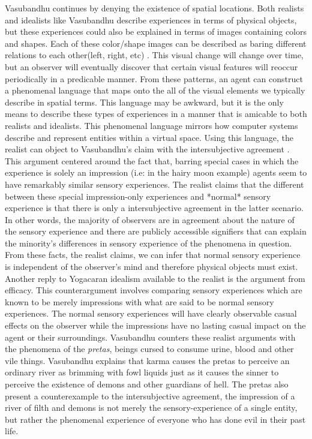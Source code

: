  Vasubandhu continues by denying the existence of spatial locations. Both realists and idealists like Vasubandhu describe experiences in terms of physical objects, but these experiences could also be explained in terms of images containing colors and shapes. Each of these color/shape images can be described as baring different relations to each other(left, right, etc) \cite{siderits2007buddhism}. This visual change will change over time, but an observer will eventually discover that certain visual features will reoccur periodically in a predicable manner. From these patterns, an agent can construct a phenomenal language that maps onto the all of the visual elements we typically describe in spatial terms. This language may be awkward, but it is the only means to describe these types of experiences in a manner that is amicable to both realists and idealists. This phenomenal language mirrors how computer systems describe and represent entities within a virtual space. Using this language, the realist can object to Vasubandhu's claim with the intersubjective agreement \cite{siderits2007buddhism}. This argument centered around the fact that, barring special cases in which the experience is solely an impression (i.e: in the hairy moon example) agents seem to have remarkably similar sensory experiences. The realist claims that the different between these special impression-only experiences and *normal* sensory experience is that there is only a intersubjective agreement in the latter scenario. In other words, the majority of observers are in agreement about the nature of the sensory experience and there are publicly accessible signifiers that can explain the minority's differences in sensory experience of the phenomena in question. From these facts, the realist claims, we can infer that normal sensory experience is independent of the observer's mind and therefore physical objects must exist. Another reply to Yogacaran idealism available to the realist is the argument from efficacy. This counterargument involves comparing sensory experiences which are known to be merely impressions with what are said to be normal sensory experiences. The normal sensory experiences will have clearly observable casual effects on the observer while the impressions have no lasting casual impact on the agent or their surroundings. \newline Vasubandhu counters these realist arguments with the phenomena of the \textit{pretas}, beings cursed to consume urine, blood and other vile things. Vasubandhu explains that karma causes the pretas to perceive an ordinary river as brimming with fowl liquids just as it causes the sinner to perceive the existence of demons and other guardians of hell. The pretas also present a counterexample to the intersubjective agreement, the impression of a river of filth and demons is not merely the sensory-experience of a single entity, but rather the phenomenal  experience of everyone who has done evil in their past life.  




